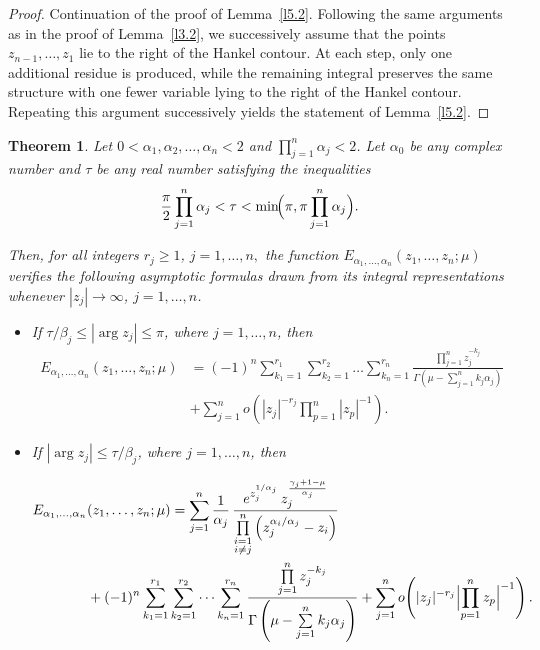 \documentclass[12pt, reqno]{amsart}
\newtheorem{theorem}{Theorem}[section]
\theoremstyle{definition}
\theoremstyle{remark}
\numberwithin{equation}{section}
\begin{document}
\begin{proof}
Continuation of the proof of Lemma~\ref{l5.2}. Following the same arguments as in the proof of Lemma~\ref{l3.2}, we successively assume that the points $z_{n-1},\ldots,z_1$ lie to the right of the Hankel contour. At each step, only one additional residue is produced, while the remaining integral preserves the same structure with one fewer variable lying to the right of the Hankel contour. Repeating this argument successively yields the statement of Lemma~\ref{l5.2}.


\end{proof}


\begin{theorem}\label{thm5.3}
    Let $0 < \alpha_1, \alpha_2,\dots,\alpha_n < 2$ and $\prod\limits_{{j=1}}^n\alpha_j < 2$. Let $\alpha_0$ be any complex number and
$\tau$ be any real number satisfying the inequalities
$$
\frac{\pi}{2}\prod_{{j=1}}^n\alpha_j
<
\tau
<
\min\!\Bigl(\pi,\pi\prod_{{j=1}}^n\alpha_j\Bigr).
$$

Then, for all integers $r_j\geq 1$, $j=1,\dots,n,$ the function
$E_{\alpha_1, \dots, \alpha_n }(z_1, \dots, z_n;\mu)$ verifies the following asymptotic formulas
drawn from its integral representations whenever $|z_j|\to\infty$, $j=1,\dots,n$.
\begin{itemize}
    \item If $\tau/\beta_j \leq |\arg z_j| \leq \pi$, where $j=1,\dots,n$, then
$$\begin{aligned}E_{\alpha_1, \dots, \alpha_n }(z_1, \dots, z_n;\mu)
&=(-1)^n\sum_{k_1=1}^{r_{1}}
\sum_{k_2=1}^{r_{2}}\dots
\sum_{k_n=1}^{r_{n}}
\frac{\prod\limits_{j=1}^nz_j^{-k_j}}{\Gamma(\mu-\sum_{j=1}^nk_j\alpha_j)}\\
&+
\sum_{j=1}^{n}
o\!\left(
|z_j|^{-r_j}
\prod_{p=1}^{n}|z_p|^{-1}
\right).\end{aligned}
$$

\item If $ |\arg z_j| \leq \tau/\beta_j $, where $j=1,\dots,n$, then

$$\begin{aligned}
E_{\alpha_1, \dots, \alpha_n }&(z_1, \dots, z_n;\mu)
=
\sum_{j=1}^{n}
\frac{1}{\alpha_j}\,
\frac{
e^{z_j^{1/\alpha_j}}
\,z_j^{\frac{\gamma_j+1-\mu}{\alpha_j}}
}{
\prod\limits_{\substack{i=1\\i\neq j}}^{n}
\left(z_j^{\alpha_i/\alpha_j}-z_i\right)
}\\
&+(-1)^n\sum_{k_1=1}^{r_{1}}
\sum_{k_2=1}^{r_{2}}\dots
\sum_{k_n=1}^{r_{n}}
\frac{\prod\limits_{j=1}^nz_j^{-k_j}}{\Gamma\left(\mu-\sum\limits_{j=1}^nk_j\alpha_j\right)}+\sum_{j=1}^no\!\left(|z_j|^{-r_{j}}\Bigl|\prod_{p=1}^nz_p\Bigr|^{-1}\right).\end{aligned}$$
\end{itemize}
\end{theorem}
\end{document}
